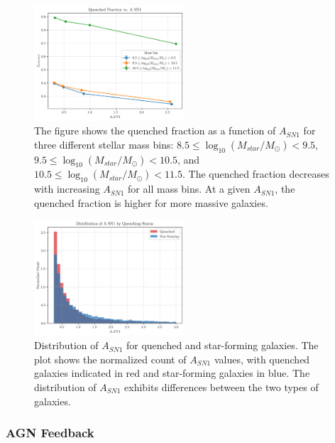 \documentclass[twocolumn]{aastex631}
\begin{document}
\begin{figure}[h!]
    \centering
    \includegraphics[width=0.5\textwidth]{../Project6/plots/fquenched_vs_A_SN1_20250424_133824.png}
    \caption{\label{fig:fquenched_ASN1} The figure shows the quenched fraction as a function of $A_{SN1}$ for three different stellar mass bins: $8.5 \leq \log_{10}(M_{star}/M_{\odot}) < 9.5$, $9.5 \leq \log_{10}(M_{star}/M_{\odot}) < 10.5$, and $10.5 \leq \log_{10}(M_{star}/M_{\odot}) < 11.5$. The quenched fraction decreases with increasing $A_{SN1}$ for all mass bins. At a given $A_{SN1}$, the quenched fraction is higher for more massive galaxies.
}
\end{figure}

\begin{figure}[h!]
    \centering
    \includegraphics[width=0.5\textwidth]{../Project6/plots/A_SN1_histogram_3_20250424_133143.png}
    \caption{\label{fig:ASN1_hist} Distribution of $A_{SN1}$ for quenched and star-forming galaxies. The plot shows the normalized count of $A_{SN1}$ values, with quenched galaxies indicated in red and star-forming galaxies in blue. The distribution of $A_{SN1}$ exhibits differences between the two types of galaxies.
}
\end{figure}

\subsubsection{AGN Feedback}
\end{document}
